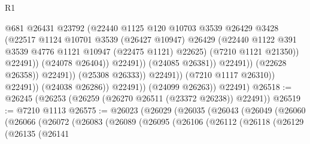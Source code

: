 \begin{lexlean}{R1}
\begin{coremodule}
                                              @681
                                              @26431
                                              @23792
                                              (@22440
                                                @1125
                                                @120
                                                @10703
                                                @3539
                                                @26429
                                                @3428
                                                (@22517
                                                  @1124
                                                  @10701
                                                  @3539
                                                  (@26427 @10947)
                                                  @26429
                                                  (@22440
                                                    @1122
                                                    @391
                                                    @3539
                                                    @4776
                                                    @1121
                                                    @10947
                                                    (@22475 @1121)
                                                    @22625)
                                                  (@7210 @1121 @21350))
                                                @22491))
                                            (@24078 @26404))
                                          @22491))
                                      (@24085 @26381))
                                    @22491))
                                (@22628 @26358))
                              @22491))
                          (@25308 @26333))
                        @22491))
                    (@7210 @1117 @26310))
                  @22491))
              (@24038 @26286))
            @22491))
        (@24099 @26263))
      @22491)
@26518 := @26245 (@26253 (@26259 (@26270 @26511 (@23372 @26238)) @22491))
@26519 := @7210 @1113
@26575 := @26023
    (@26029
      (@26035
        (@26043
          (@26049
            (@26060
              (@26066
                (@26072
                  (@26083
                    (@26089
                      (@26095
                        (@26106
                          (@26112
                            (@26118
                              (@26129
                                (@26135
                                  (@26141

\end{coremodule}
\end{lexlean}
